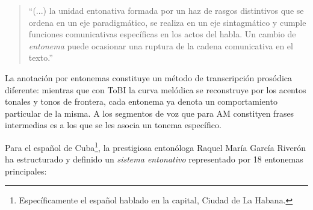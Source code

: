 \begin{quote}
``(...) la unidad entonativa formada por un haz de rasgos distintivos que se ordena en un eje paradigm\'atico, se realiza en un eje sintagm\'atico y cumple funciones comunicativas espec\'ificas en los actos del habla. Un cambio de \emph{entonema} puede ocasionar una ruptura de la cadena comunicativa en el texto.''
\end{quote}

La anotaci\'on por entonemas constituye un m\'etodo de transcripci\'on pros\'odica diferente: mientras que con ToBI la curva mel\'odica se reconstruye por los acentos tonales y tonos de frontera, cada entonema ya denota un comportamiento particular de la misma. A los segmentos de voz que para AM constityen frases intermedias es a los que se les asocia un tonema espec\'ifico.

Para el espa\~nol de Cuba\footnote{Espec\'ificamente el espa\~nol hablado en la capital, Ciudad de La Habana.}, la prestigiosa enton\'ologa Raquel Mar\'ia Garc\'ia River\'on ha estructurado y definido un \emph{sistema entonativo} representado por 18 entonemas principales:

